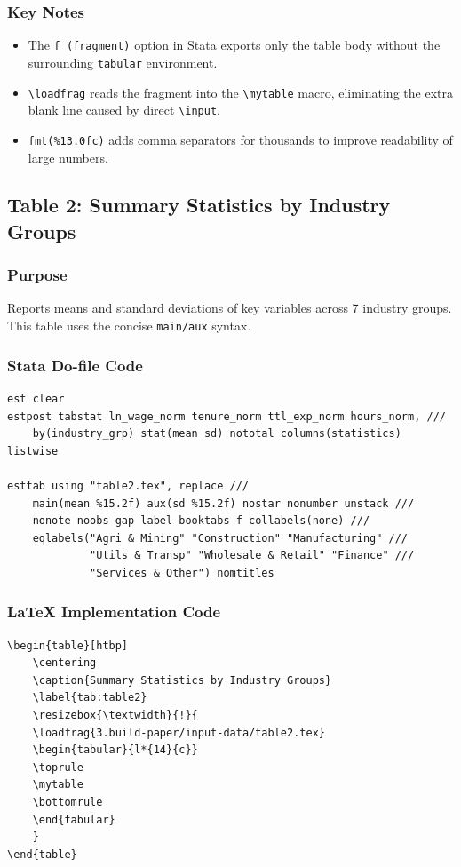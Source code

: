 \documentclass[11pt]{article}
\numberwithin{table}{section}
\newcommand{\loadfrag}[1]{%
	\begin{filecontents*}{#1}%
	\end{filecontents*}%
	\CatchFileDef{\mytable}{#1}{}%
}
\begin{document}
\subsubsection{Key Notes}
\begin{itemize}
    \item The \texttt{f (fragment)} option in Stata exports only the table body without the surrounding \texttt{tabular} environment.
    \item \texttt{\textbackslash loadfrag} reads the fragment into the \texttt{\textbackslash mytable} macro, eliminating the extra blank line caused by direct \texttt{\textbackslash input}.
    \item \texttt{fmt(\%13.0fc)} adds comma separators for thousands to improve readability of large numbers.
\end{itemize}

\clearpage
\subsection{Table 2: Summary Statistics by Industry Groups}
\subsubsection{Purpose}
Reports means and standard deviations of key variables across 7 industry groups. This table uses the concise \texttt{main/aux} syntax.

\subsubsection{Stata Do-file Code}
\begin{lstlisting}[style=stata]
est clear
estpost tabstat ln_wage_norm tenure_norm ttl_exp_norm hours_norm, ///
    by(industry_grp) stat(mean sd) nototal columns(statistics) listwise

esttab using "table2.tex", replace ///
    main(mean %15.2f) aux(sd %15.2f) nostar nonumber unstack ///
    nonote noobs gap label booktabs f collabels(none) ///
    eqlabels("Agri & Mining" "Construction" "Manufacturing" ///
             "Utils & Transp" "Wholesale & Retail" "Finance" ///
             "Services & Other") nomtitles
\end{lstlisting}

\subsubsection{LaTeX Implementation Code}
\begin{lstlisting}[style=latex]
\begin{table}[htbp]
    \centering
    \caption{Summary Statistics by Industry Groups}
    \label{tab:table2}
    \resizebox{\textwidth}{!}{
    \loadfrag{3.build-paper/input-data/table2.tex}
    \begin{tabular}{l*{14}{c}}
    \toprule
    \mytable
    \bottomrule
    \end{tabular}
    }
\end{table}
\end{lstlisting}
\end{document}
